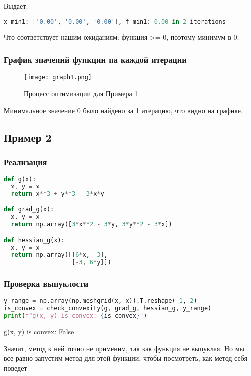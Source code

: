 \documentclass{article}
\begin{document}
Выдает:

\begin{lstlisting}[language=Python]
x_min1: ['0.00', '0.00', '0.00'], f_min1: 0.00 in 2 iterations
\end{lstlisting}

Что соответствует нашим ожиданиям: функция >=  0, поэтому минимум в 0.

\subsubsection{График значений функции на каждой итерации}

\begin{figure}[H]
    \centering
    \texttt{[image: graph1.png]}
    \caption{Процесс оптимизации для Примера 1}
\end{figure}

Минимальное значение 0 было найдено за 1 итерацию, что видно на графике.


\newpage
\subsection{Пример 2}

\subsubsection{Реализация}
\begin{lstlisting}[language=Python]
def g(x):
  x, y = x
  return x**3 + y**3 - 3*x*y

def grad_g(x):
  x, y = x
  return np.array([3*x**2 - 3*y, 3*y**2 - 3*x])

def hessian_g(x):
  x, y = x
  return np.array([[6*x, -3],
                   [-3, 6*y]])
\end{lstlisting}

\subsubsection{Проверка выпуклости}
\begin{lstlisting}[language=Python]
y_range = np.array(np.meshgrid(x, x)).T.reshape(-1, 2)
is_convex = check_convexity(g, grad_g, hessian_g, y_range)
print(f"g(x, y) is convex: {is_convex}")
\end{lstlisting}

g(x, y) is convex: False

Значит, метод к ней точно не применим, так как функция не выпуклая. Но мы все равно запустим метод для этой функции, чтобы посмотреть, как метод себя поведет
\end{document}
